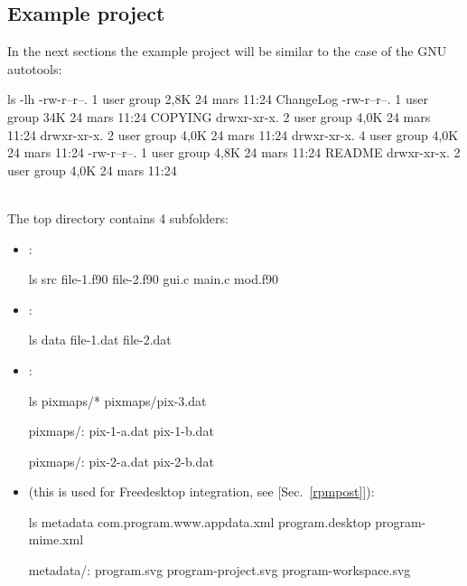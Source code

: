 \subsection{Example project}
\label{example_project}
In the next sections the example project will be similar to the case of the GNU autotools: 
{\footnotesize{
\begin{script}
 ls -lh
-rw-r--r--. 1 user group 2,8K 24 mars  11:24 ChangeLog
-rw-r--r--. 1 user group  34K 24 mars  11:24 COPYING
drwxr-xr-x. 2 user group 4,0K 24 mars  11:24 
drwxr-xr-x. 2 user group 4,0K 24 mars  11:24 
drwxr-xr-x. 4 user group 4,0K 24 mars  11:24 
-rw-r--r--. 1 user group 4,8K 24 mars  11:24 README
drwxr-xr-x. 2 user group 4,0K 24 mars  11:24 
\end{script}
}}
\vspace{-0.25cm}
\\
\noindent The top directory contains 4 subfolders:
\begin{itemize}
\item {}:
{\footnotesize{
\begin{scripti}
 ls src
file-1.f90    file-2.f90    gui.c    main.c    mod.f90
\end{scripti}
}}
\vspace{-0.75cm} \item {}:
{\footnotesize{
\begin{scripti}
 ls data
file-1.dat    file-2.dat
\end{scripti}
}}
\vspace{-0.75cm}
\item {}:
{\footnotesize{
\begin{scripti}
 ls pixmaps/*
pixmaps/pix-3.dat

pixmaps/:
pix-1-a.dat    pix-1-b.dat

pixmaps/:
pix-2-a.dat    pix-2-b.dat
\end{scripti}
}}
\vspace{-0.75cm} \item {} (this is used for Freedesktop integration, see [Sec.~\ref{rpmpost}]):
{\footnotesize{
\begin{scripti}
 ls metadata
com.program.www.appdata.xml    program.desktop    program-mime.xml

metadata/:
program.svg    program-project.svg    program-workspace.svg
\end{scripti}
}}
\end{itemize}

